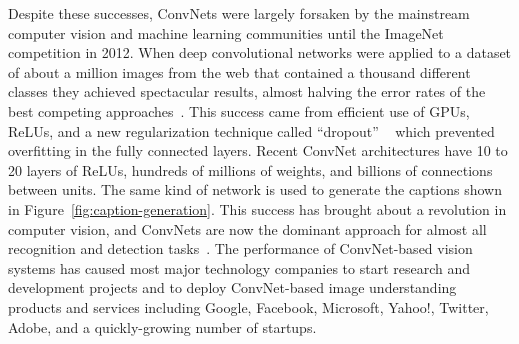 \documentclass[10pts]{article}
\begin{document}
Despite these successes, ConvNets were largely forsaken by the
mainstream computer vision and machine learning communities until the
ImageNet competition in 2012.  When deep convolutional networks were
applied to a dataset of about a million images from the web that
contained a thousand different classes they achieved spectacular
results, almost halving the error rates of the best competing
approaches~\citep{Krizhevsky-2012-small}.  This success came from efficient use of GPUs,
ReLUs, and a new regularization technique called ``dropout''
~\citep{Srivastava14} which prevented overfitting in the fully
connected layers. 
Recent ConvNet
architectures have 10 to 20 layers of ReLUs, hundreds of millions of
weights, and billions of connections between units. The same kind of
network is used to generate the captions shown in
Figure~\ref{fig:caption-generation}. This success has brought about a
revolution in computer vision, and ConvNets are now the dominant
approach for almost all recognition and detection
tasks~\citep{sermanet-iclr-14,girshick-cvpr-2014,taigman-cvpr-2014,simonyan-arxiv-2014,szegedy-2014,Tompson-et-al-arxiv2014}.
The performance of ConvNet-based vision systems has caused most major
technology companies to start research and development projects and to
deploy ConvNet-based image understanding products and services
including Google, Facebook, Microsoft, Yahoo!, Twitter, Adobe, and a
quickly-growing number of startups.
\end{document}
